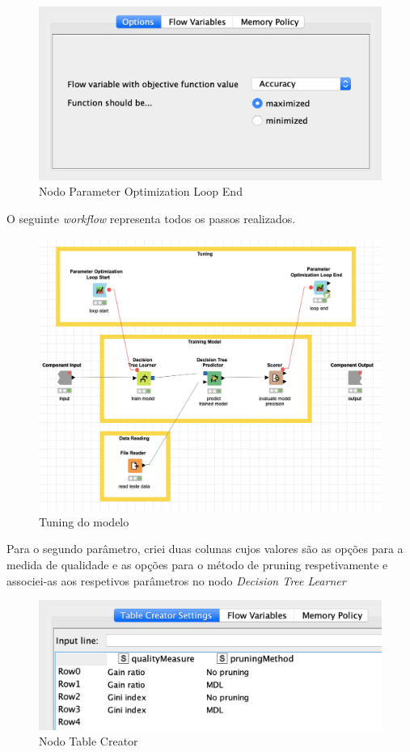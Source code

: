 \begin{figure}[H]
    \centering
    \includegraphics[scale=0.4]{Images/T4_a3.png}
    \caption{Nodo Parameter Optimization Loop End}
\end{figure}

O seguinte \textit{workflow} representa todos os passos realizados.

\begin{figure}[H]
    \centering
    \includegraphics[scale=0.4]{Images/T4_a4.png}
    \caption{Tuning do modelo}
\end{figure}

Para o segundo parâmetro, criei duas colunas cujos valores são as opções para a medida de qualidade e as opções para o método de pruning respetivamente e associei-as aos respetivos parâmetros no nodo \textit{Decision Tree Learner}

\begin{figure}[H]
    \centering
    \includegraphics[scale=0.4]{Images/T4_b1.png}
    \caption{Nodo Table Creator}
\end{figure}

